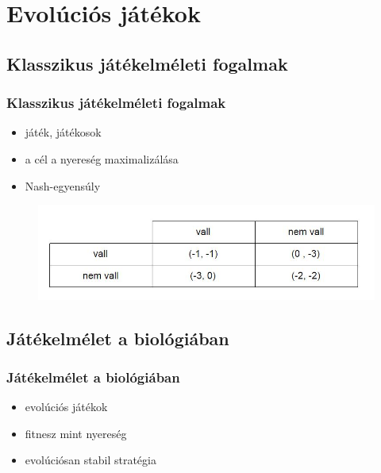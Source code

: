 \section{Evolúciós játékok}

\subsection{Klasszikus játékelméleti fogalmak}
\begin{frame}
\frametitle{Klasszikus játékelméleti fogalmak}
\begin{itemize}
	\item játék, játékosok
	\item a cél a nyereség maximalizálása
	\item Nash-egyensúly
\end{itemize}
\begin{figure}
	\includegraphics[width=\linewidth]{images/prisoners}
\end{figure}
\end{frame}


\subsection{Játékelmélet a biológiában}
\begin{frame}
\frametitle{Játékelmélet a biológiában}
\begin{itemize}
	\item evolúciós játékok
	\item fitnesz mint nyereség
	\item evolúciósan stabil stratégia
\end{itemize}
\end{frame}

